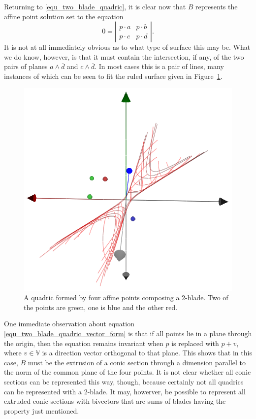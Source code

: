 \documentclass{birkjour}
\theoremstyle{definition}
\theoremstyle{remark}
\numberwithin{equation}{section}
\newcommand{\V}{\mathbb{V}}
\begin{document}
Returning to \eqref{equ_two_blade_quadric}, it is clear now that $B$ represents
the affine point solution set to the equation
\begin{equation}\label{equ_two_blade_quadric_vector_form}
0 = \left|\begin{array}{cc} p\cdot a & p\cdot b \\ p\cdot c & p\cdot d \end{array}\right|.
\end{equation}
It is not at all immediately obvious as to what type of surface this may be.
What we do know, however, is that it must
contain the intersection, if any, of the two pairs of planes $a\wedge\overline{d}$ and $c\wedge\overline{d}$.
In most cases this is a pair of lines, many instances of which can be seen to fit the ruled surface
given in Figure~\ref{fig_quadric_blade}.

\begin{figure}
\includegraphics[scale=0.5]{QuadricBlade}
\caption{A quadric formed by four affine points composing a 2-blade.
Two of the points are green, one is blue and the other red.}
\label{fig_quadric_blade}
\end{figure}

One immediate observation about equation \eqref{equ_two_blade_quadric_vector_form}
is that if all points lie in a plane through the origin, then the equation remains
invariant when $p$ is replaced with $p+v$, where $v\in\V$ is a direction vector
orthogonal to that plane.  This shows that in this case, $B$ must be the
extrusion of a conic section through a dimension parallel to the norm of
the common plane of the four points.  It is not clear whether all conic
sections can be represented this way, though, because certainly not
all quadrics can be represented with a 2-blade.  It may, howerver,
be possible to represent all extruded conic sections with bivectors that are sums
of blades having the property just mentioned.
\end{document}
